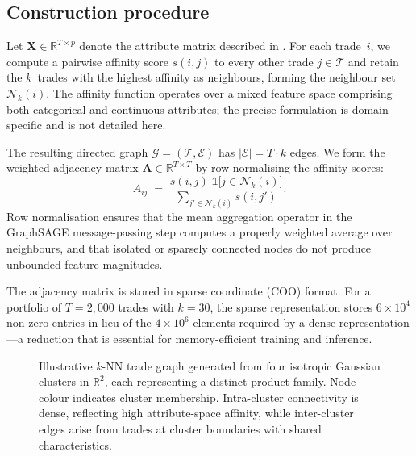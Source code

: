 \documentclass[11pt,a4paper]{article}
\newcommand{\R}{\mathbb{R}}
\newcommand{\indicator}{\mathbb{1}}
\newcommand{\calT}{\mathcal{T}}
\newcommand{\calG}{\mathcal{G}}
\newcommand{\calE}{\mathcal{E}}
\newcommand{\calN}{\mathcal{N}}
\newcommand{\bA}{\bm{A}}
\newcommand{\bX}{\bm{X}}
\begin{document}
\subsection{Construction procedure}\label{sec:graph:construction}

Let $\bX \in \R^{T \times p}$ denote the attribute matrix described in
.  For each trade~$i$, we compute a pairwise affinity
score $s(i,j)$ to every other trade $j \in \calT$ and retain the $k$~trades
with the highest affinity as neighbours, forming the neighbour set
$\calN_k(i)$.  The affinity function operates over a mixed feature space
comprising both categorical and continuous attributes; the precise formulation
is domain-specific and is not detailed here.

The resulting directed graph $\calG = (\calT, \calE)$ has
$|\calE| = T \cdot k$ edges.  We form the weighted adjacency matrix
$\bA \in \R^{T \times T}$ by row-normalising the affinity scores:
%
\begin{equation}\label{eq:adjacency}
  A_{ij}
  \;=\;
  \frac{
    s(i,j)\;\indicator\bigl[j \in \calN_k(i)\bigr]
  }{
    \displaystyle\sum_{j' \in \calN_k(i)} s(i,j')
  }.
\end{equation}
%
Row normalisation ensures that the mean aggregation operator in the
GraphSAGE message-passing step \cite{hamilton2017inductive} computes a
properly weighted average over neighbours, and that isolated or sparsely
connected nodes do not produce unbounded feature magnitudes.

The adjacency matrix is stored in sparse coordinate (COO) format.  For a
portfolio of $T = 2{,}000$ trades with $k = 30$, the sparse representation
stores $6 \times 10^4$ non-zero entries in lieu of the $4 \times 10^6$
elements required by a dense representation---a reduction that is essential
for memory-efficient training and inference.

\begin{figure}[t]
  \centering
  \caption{%
    Illustrative $k$-NN trade graph generated from four isotropic Gaussian
    clusters in $\R^2$, each representing a distinct product family.  Node
    colour indicates cluster membership.  Intra-cluster connectivity is
    dense, reflecting high attribute-space affinity, while inter-cluster edges
    arise from trades at cluster boundaries with shared characteristics.%
  }
  \label{fig:trade-graph}
\end{figure}
\end{document}

